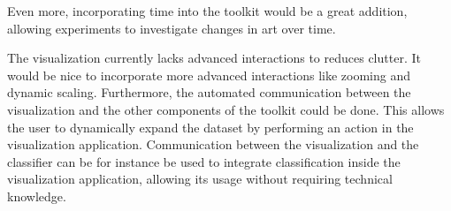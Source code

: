 Even more, incorporating time into the toolkit would be a great addition, allowing experiments to investigate changes in art over time.

The visualization currently lacks advanced interactions to reduces clutter.
It would be nice to incorporate more advanced interactions like zooming and dynamic scaling.
Furthermore, the automated communication between the visualization and the other components of the toolkit could be done. This allows the user to dynamically expand the dataset by performing an action in the visualization application. 
Communication between the visualization and the classifier can be for instance be used to integrate classification inside the visualization application, allowing its usage without requiring technical knowledge.

